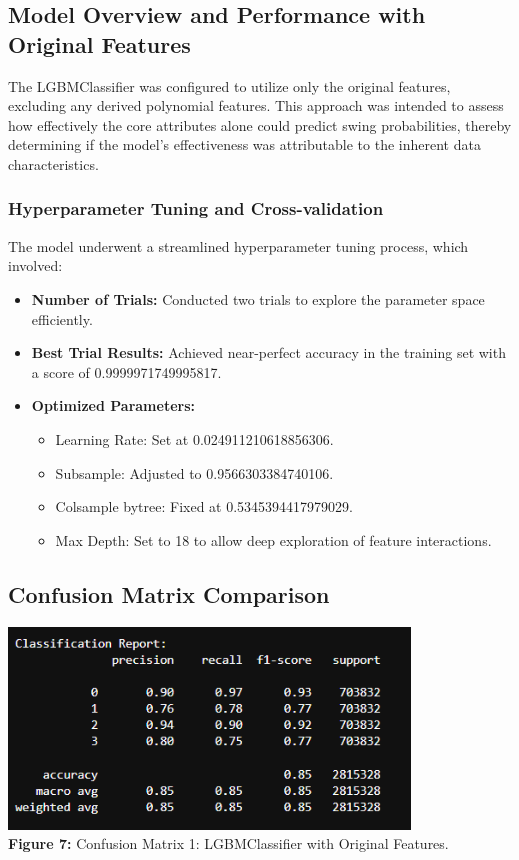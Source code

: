 \documentclass[12pt]{article}
\begin{document}
\subsection*{Model Overview and Performance with Original Features}
The LGBMClassifier was configured to utilize only the original features, excluding any derived polynomial features. This approach was intended to assess how effectively the core attributes alone could predict swing probabilities, thereby determining if the model's effectiveness was attributable to the inherent data characteristics.

\subsubsection*{Hyperparameter Tuning and Cross-validation}
The model underwent a streamlined hyperparameter tuning process, which involved:
\begin{itemize}
    \item \textbf{Number of Trials:} Conducted two trials to explore the parameter space efficiently.
    \item \textbf{Best Trial Results:} Achieved near-perfect accuracy in the training set with a score of 0.9999971749995817.
    \item \textbf{Optimized Parameters:}
    \begin{itemize}
        \item Learning Rate: Set at 0.024911210618856306.
        \item Subsample: Adjusted to 0.9566303384740106.
        \item Colsample bytree: Fixed at 0.5345394417979029.
        \item Max Depth: Set to 18 to allow deep exploration of feature interactions.
    \end{itemize}
\end{itemize}

\subsection*{Confusion Matrix Comparison}
\begin{center}
    \includegraphics[width=0.8\textwidth]{LgbmOriginal2.png}
    \textbf{\\Figure 7:} Confusion Matrix 1: LGBMClassifier with Original Features.
\end{center}
\end{document}
